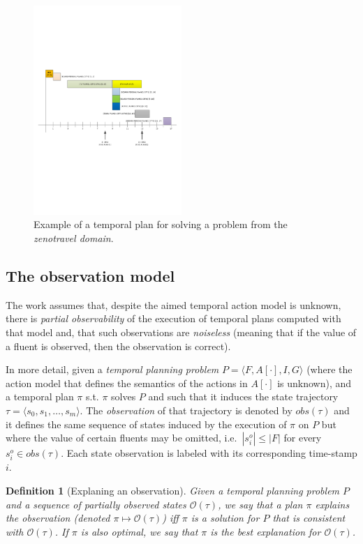\documentclass[letterpaper]{article} %
\newcommand{\tup}[1]{{\langle #1 \rangle}}
\newtheorem{definition}[theorem]{Definition}
\begin{document}
\begin{figure}
        \includegraphics[width=0.5\textwidth]{plan}
	\caption{Example of a temporal plan for solving a problem from the {\em zenotravel domain}.}
	\label{fig:plan}
\end{figure}


\subsection{The observation model}
The work assumes that, despite the aimed temporal action model is unknown, there is {\em partial observability} of the execution of temporal plans computed with that model and, that such observations are {\em noiseless} (meaning that if the value of a fluent is observed, then the observation is correct).

In more detail, given a {\em temporal planning problem} $P=\tup{F,A[\cdot],I,G}$ (where the action model that defines the semantics of the actions in $A[\cdot]$ is unknown), and a temporal plan $\pi$ s.t. $\pi$ solves $P$ and such that it induces the state trajectory $\tau=\tup{s_0, s_1, \ldots, s_m}$. The {\em observation} of that trajectory is denoted by $obs(\tau)$ and it defines the same sequence of states induced by the execution of $\pi$ on $P$ but where the value of certain fluents may be omitted, i.e.~$|s^o_i|\leq |F|$ for every $s^o_i\in obs(\tau)$. Each state observation is labeled with its corresponding time-stamp $i$.

\begin{definition}[Explaning an observation]
Given a {\em temporal planning problem} $P$ and a sequence of partially observed states $\mathcal{O}(\tau)$, we say that a plan $\pi$ {\em explains the observation} (denoted $\pi\mapsto\mathcal{O}(\tau)$) iff $\pi$ is a solution for $P$ that is {\em  consistent} with $\mathcal{O}(\tau)$. If $\pi$ is also optimal, we say that $\pi$ is the {\em best explanation} for $\mathcal{O}(\tau)$. 
\end{definition}
\end{document}
